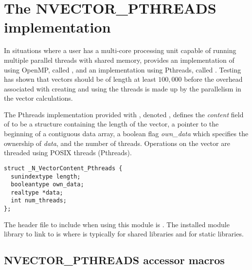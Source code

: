 \section{The NVECTOR\_PTHREADS implementation}\label{ss:nvec_pthreads}

In situations where a user has a multi-core processing unit capable of
running multiple parallel threads with shared memory, {\sundials} provides
an implementation of {\nvector} using OpenMP, called {\nvecopenmp}, and
an implementation using Pthreads, called {\nvecpthreads}.
Testing has shown that vectors should be of length at least $100,000$
before the overhead associated with creating and using the threads is
made up by the parallelism in the vector calculations.

The Pthreads {\nvector} implementation provided with {\sundials}, denoted
{\nvecpthreads}, defines the {\em content} field of  to be a structure
containing the length of the vector, a pointer to the beginning of a contiguous
data array, a boolean flag {\em own\_data} which specifies the ownership
of {\em data}, and the number of threads.
Operations on the vector are threaded using POSIX threads
(Pthreads).
\begin{verbatim}
struct _N_VectorContent_Pthreads {
  sunindextype length;
  booleantype own_data;
  realtype *data;
  int num_threads;
};
\end{verbatim}

The header file to include when using this module is .
The installed module library to link to is
where  is typically  for shared libraries and 
for static libraries.

\subsection{NVECTOR\_PTHREADS accessor macros}
\label{ss:nvec_pthreads_macros}

